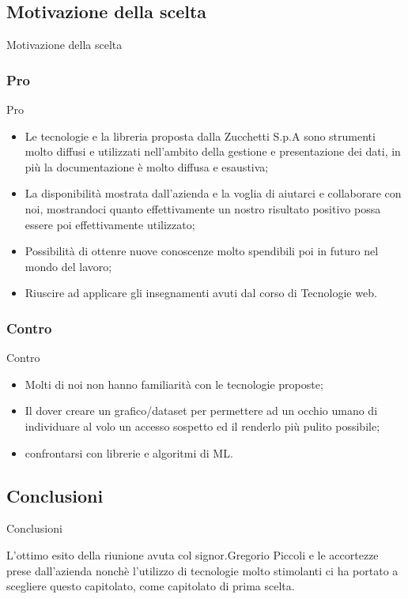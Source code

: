\documentclass[11pt]{article}
\begin{document}
    \subsection{Motivazione della scelta} Motivazione della scelta
        \subsubsection{Pro} Pro
        \begin{itemize}
            \item Le tecnologie e la libreria proposta dalla Zucchetti S.p.A sono strumenti molto diffusi e utilizzati nell'ambito della gestione e presentazione dei dati, in più la documentazione è molto diffusa e esaustiva;
            \item La disponibilità mostrata dall'azienda e la voglia di aiutarci e collaborare con noi, mostrandoci quanto effettivamente un nostro risultato positivo possa essere poi effettivamente utilizzato;
            \item Possibilità di ottenre nuove conoscenze molto spendibili poi in futuro nel mondo del lavoro;
            \item Riuscire ad applicare gli insegnamenti avuti dal corso di Tecnologie web.
        \end{itemize}
        \subsubsection{Contro} Contro
        \begin{itemize}
            \item Molti di noi non hanno familiarità con le tecnologie proposte;
            \item Il dover creare un grafico/dataset per permettere ad un occhio umano di individuare al volo un accesso sospetto ed il renderlo più pulito possibile;
            \item confrontarsi con librerie e algoritmi di ML.
        \end{itemize}
    
    \subsection{Conclusioni} Conclusioni
    
    L'ottimo esito della riunione avuta col signor.Gregorio Piccoli e le accortezze prese dall'azienda nonchè l'utilizzo di tecnologie molto stimolanti ci ha portato a scegliere questo capitolato, come capitolato di prima scelta.
    
\end{document}

